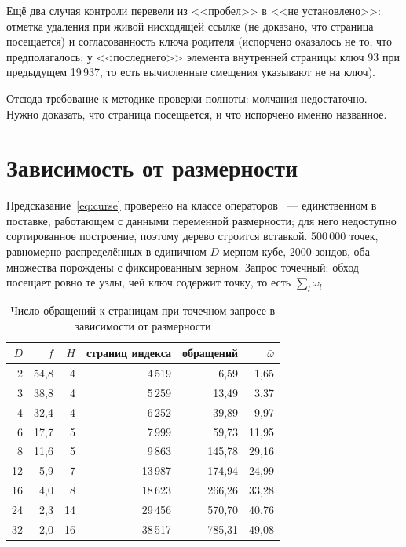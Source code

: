 Ещё два случая контроли перевели из <<пробел>> в <<не установлено>>: отметка
удаления при живой нисходящей ссылке (не доказано, что страница посещается) и
согласованность ключа родителя (испорчено оказалось не то, что предполагалось:
у <<последнего>> элемента внутренней страницы ключ 93 при предыдущем 19\,937,
то есть вычисленные смещения указывают не на ключ).

Отсюда требование к методике проверки полноты: молчания недостаточно. Нужно
доказать, что страница посещается, и что испорчено именно названное.

\section{Зависимость от размерности}
\label{sec:eval-dim}

Предсказание~\eqref{eq:curse} проверено на классе операторов ~---
единственном в поставке, работающем с данными переменной размерности; для него
недоступно сортированное построение, поэтому дерево строится вставкой.
500\,000 точек, равномерно распределённых в единичном $D$-мерном кубе, 2000
зондов, оба множества порождены с фиксированным зерном. Запрос точечный: обход
посещает ровно те узлы, чей ключ содержит точку, то есть $\sum_l \omega_l$.

\begin{table}[htbp]
\centering
\caption{Число обращений к страницам при точечном запросе в зависимости от
размерности}
\label{tab:dim}
\begin{tabular}{rrrrrr}
\toprule
$D$ & $f$ & $H$ & страниц индекса & обращений & $\bar\omega$ \\
\midrule
2 & 54,8 & 4 & 4\,519 & 6,59 & 1,65 \\
3 & 38,8 & 4 & 5\,259 & 13,49 & 3,37 \\
4 & 32,4 & 4 & 6\,252 & 39,89 & 9,97 \\
6 & 17,7 & 5 & 7\,999 & 59,73 & 11,95 \\
8 & 11,6 & 5 & 9\,863 & 145,78 & 29,16 \\
12 & 5,9 & 7 & 13\,987 & 174,94 & 24,99 \\
16 & 4,0 & 8 & 18\,623 & 266,26 & 33,28 \\
24 & 2,3 & 14 & 29\,456 & 570,70 & 40,76 \\
32 & 2,0 & 16 & 38\,517 & 785,31 & 49,08 \\
\bottomrule
\end{tabular}
\end{table}


